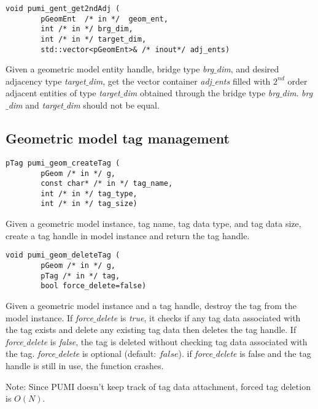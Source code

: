 \begin{verbatim}
void pumi_gent_get2ndAdj (
        pGeomEnt  /* in */  geom_ent,
        int /* in */ brg_dim, 
        int /* in */ target_dim, 
        std::vector<pGeomEnt>& /* inout*/ adj_ents)
\end{verbatim}
\vspace{-.5cm}\hspace{1cm}
        Given a geometric model entity handle, bridge type \emph{brg$\_$dim}, and desired adjacency type \emph{target$\_$dim}, get the vector container \emph{adj$\_$ents} filled with $2^{nd}$ order adjacent entities of type \emph{target$\_$dim} obtained through the bridge type \emph{brg$\_$dim}. \emph{brg$\_$dim} and \emph{target$\_$dim} should not be equal.

\subsection{Geometric model tag management}
\begin{verbatim}
pTag pumi_geom_createTag (
        pGeom /* in */ g, 
        const char* /* in */ tag_name, 
        int /* in */ tag_type, 
        int /* in */ tag_size)
\end{verbatim}\vspace{-.5cm}\hspace{1cm}
        Given a geometric model instance, tag name, tag data type, and tag data size, create a tag handle in model instance and return the tag handle.

\begin{verbatim}
void pumi_geom_deleteTag (
        pGeom /* in */ g, 
        pTag /* in */ tag, 
        bool force_delete=false)
\end{verbatim}\vspace{-.5 cm}\hspace{1cm}
       Given a geometric model instance and a tag handle, destroy the tag from the model instance. If \emph{force$\_$delete} is \emph{true}, it checks if any tag data associated with the tag exists and delete any existing tag data then deletes the tag handle. If \emph{force$\_$delete} is \emph{false}, the tag is deleted without checking tag data associated with the tag. \emph{force$\_$delete} is optional (default: $false$). if \emph{force$\_$delete} is false and the tag handle is still in use, the function crashes.

Note: Since PUMI doesn't keep track of tag data attachment, forced tag deletion is $O(N)$.

